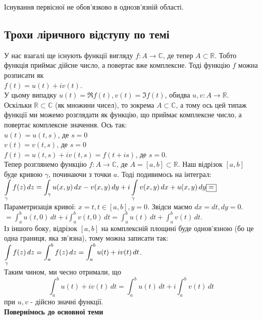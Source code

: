 \documentclass{math_library}
\begin{document}
\begin{remark}
Існування первісної не обов'язково в однозв'язній області.
\end{remark}

\subsection*{Трохи ліричного відступу по темі}
У нас взагалі ще існують функції вигляду $f: A \to \mathbb{C}$, де тепер $A \subset \mathbb{R}$. Тобто функція приймає дійсне число, а повертає вже комплексне. Тоді функцію $f$ можна розписати як\\
$f(t) = u(t) + iv(t)$.\\
У цьому випадку $u(t) = \Re f(t), v(t) = \Im f(t)$, обидва $u,v: A \to \mathbb{R}$.
\bigskip \\
Оскільки $\mathbb{R} \subset \mathbb{C}$ (як множини чисел), то зокрема $A \subset \mathbb{C}$, а тому ось цей типаж функції ми можемо розглядати як функцію, що приймає комплексне число, а повертає комплексне значення. Ось так:\\
$u(t) = u(t,s)$, де $s = 0$\\
$v(t) = v(t,s)$, де $s = 0$\\
$f(t) = u(t,s) + iv(t,s) = f(t+is)$, де $s = 0$.
\bigskip \\
Тепер розглянемо функцію $f: A \to \mathbb{C}$, де $A = [a,b] \subset \mathbb{R}$. Наш відрізок $[a,b]$ буде кривою $\gamma$, починаючи з точки $a$. Тоді подивимось на інтеграл:\\
$\displaystyle\int\displaylimits_\gamma f(z)\,dz = \int_\gamma u(x,y)\,dx -v(x,y)\,dy + i \int\displaylimits_\gamma v(x,y)\,dx + u(x,y)\,dy \boxed{=}$\\
Параметризація кривої: $x = t, t \in [a,b], y = 0$. Звідси маємо $dx = dt, dy = 0$.\\
$\boxed{=} \displaystyle\int_a^b u(t,0)\,dt + i \int_a^b v(t,0)\,dt = \int_a^b u(t)\,dt + \int_a^b v(t)\,dt$.\\
Із іншого боку, відрізок $[a,b]$ на комплексній площині буде однов'язною (бо це одна границя, яка зв'язна), тому можна записати так:\\
$\displaystyle\int\displaylimits_\gamma f(z)\,dz = \int_a^b f(z)\,dz = \int_a^b u(t)+iv(t)\,dt$.\\
Таким чином, ми чесно отримали, що
$$ \int_a^b u(t)+iv(t)\,dt = \int_a^b u(t)\,dt + i \int_a^b v(t)\,dt$$
при $u,v$ - дійсно значні функції.
\bigskip \\
\textbf{Повернімось до основної теми}
\end{document}

